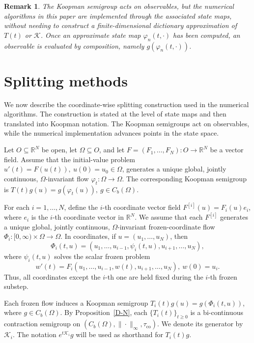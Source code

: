 \documentclass[preprint,1p,times,nopreprintline]{elsarticle}
\newtheorem{remark}[theorem]{Remark}
\begin{document}
\begin{remark}
The Koopman semigroup acts on observables, but the numerical algorithms in this paper are implemented through the associated state maps, without needing to construct a finite-dimensional dictionary approximation of $T(t)$ or $\mathcal{K}$. Once an approximate state map $\varphi_n(t,\cdot)$ has been computed, an observable is evaluated by composition, namely $g(\varphi_n(t,\cdot))$.
\end{remark}

\section{Splitting methods}
\label{sec:Splitting methods}

We now describe the coordinate-wise splitting construction used in the numerical algorithms. The construction is stated at the level of state maps and then translated into Koopman notation. The Koopman semigroups act on observables, while the numerical implementation advances points in the state space.

Let $O\subseteq\mathbb{R}^N$ be open, let $\Omega\subseteq O$, and let $F=(F_1,\ldots,F_N):O\to\mathbb{R}^N$ be a vector field. Assume that the initial-value problem $u'(t)=F(u(t)),~u(0)=u_0\in\Omega$, generates a unique global, jointly continuous, $\Omega$-invariant flow $\varphi_t:\Omega\to\Omega$. The corresponding Koopman semigroup is $T(t)g(u)=g(\varphi_t(u)),~g\in C_b(\Omega)$.

For each $i=1,\ldots,N$, define the $i$-th coordinate vector field $F^{[i]}(u)=F_i(u)e_i$, where $e_i$ is the $i$-th coordinate vector in $\mathbb{R}^N$. We assume that each $F^{[i]}$ generates a unique global, jointly continuous, $\Omega$-invariant frozen-coordinate flow $\Phi_i:[0,\infty)\times\Omega\to\Omega$. In coordinates, if $u=(u_1,\ldots,u_N)$, then
\[
\Phi_i(t,u)
=
(u_1,\ldots,u_{i-1},\psi_i(t,u),u_{i+1},\ldots,u_N),
\]
where $\psi_i(t,u)$ solves the scalar frozen problem
\[
w'(t)
=
F_i(u_1,\ldots,u_{i-1},w(t),u_{i+1},\ldots,u_N),
~
w(0)=u_i .
\]
Thus, all coordinates except the $i$-th one are held fixed during the $i$-th frozen substep.

Each frozen flow induces a Koopman semigroup $T_i(t)g(u)=g(\Phi_i(t,u))$, where $g\in C_b(\Omega)$. By Proposition~\ref{D-N}, each $\{T_i(t)\}_{t\ge 0}$ is a bi-continuous contraction semigroup on
$(C_b(\Omega),\|\cdot\|_\infty,\tau_{\mathrm{co}})$. We denote its generator by $\mathcal{K}_i$. The notation $e^{t\mathcal{K}_i}g$ will be used as shorthand for $T_i(t)g$.
\end{document}
